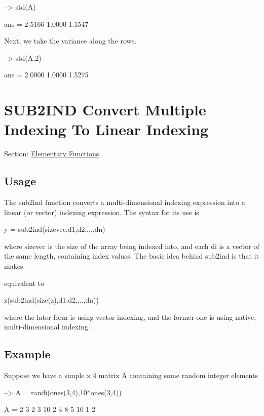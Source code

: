 \begin{DoxyVerbInclude}
--> std(A)

ans = 
    2.5166    1.0000    1.1547 
\end{DoxyVerbInclude}


Next, we take the variance along the rows.


\begin{DoxyVerbInclude}
--> std(A,2)

ans = 
    2.0000 
    1.0000 
    1.5275 
\end{DoxyVerbInclude}
 \hypertarget{elementary_sub2ind}{}\section{S\-U\-B2\-I\-N\-D Convert Multiple Indexing To Linear Indexing}\label{elementary_sub2ind}
Section\-: \hyperlink{sec_elementary}{Elementary Functions} \hypertarget{vtkwidgets_vtkxyplotwidget_Usage}{}\subsection{Usage}\label{vtkwidgets_vtkxyplotwidget_Usage}
The {\ttfamily sub2ind} function converts a multi-\/dimensional indexing expression into a linear (or vector) indexing expression. The syntax for its use is \begin{DoxyVerb}   y = sub2ind(sizevec,d1,d2,...,dn)
\end{DoxyVerb}
 where {\ttfamily sizevec} is the size of the array being indexed into, and each {\ttfamily di} is a vector of the same length, containing index values. The basic idea behind {\ttfamily sub2ind} is that it makes \begin{DoxyVerb}  [z(d1(1),d2(1),...,dn(1)),...,z(d1(n),d2(n),...,dn(n))]
\end{DoxyVerb}
 equivalent to \begin{DoxyVerb}  z(sub2ind(size(z),d1,d2,...,dn))
\end{DoxyVerb}
 where the later form is using vector indexing, and the former one is using native, multi-\/dimensional indexing. \hypertarget{variables_struct_Example}{}\subsection{Example}\label{variables_struct_Example}
Suppose we have a simple { x 4} matrix {\ttfamily A} containing some random integer elements


\begin{DoxyVerbInclude}
--> A = randi(ones(3,4),10*ones(3,4))

A = 
  2  3  2  3 
 10  2  4  8 
  5 10  1  2 
\end{DoxyVerbInclude}


